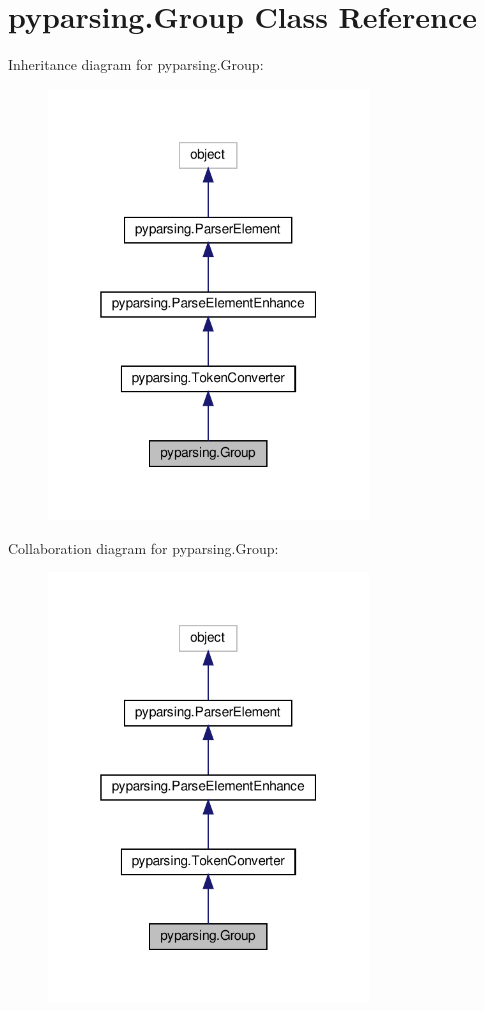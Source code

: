 \hypertarget{classpyparsing_1_1Group}{}\section{pyparsing.\+Group Class Reference}
\label{classpyparsing_1_1Group}


Inheritance diagram for pyparsing.\+Group\+:
\nopagebreak
\begin{figure}[H]
\begin{center}
\leavevmode
\includegraphics[width=241pt]{classpyparsing_1_1Group__inherit__graph}
\end{center}
\end{figure}


Collaboration diagram for pyparsing.\+Group\+:
\nopagebreak
\begin{figure}[H]
\begin{center}
\leavevmode
\includegraphics[width=241pt]{classpyparsing_1_1Group__coll__graph}
\end{center}
\end{figure}
